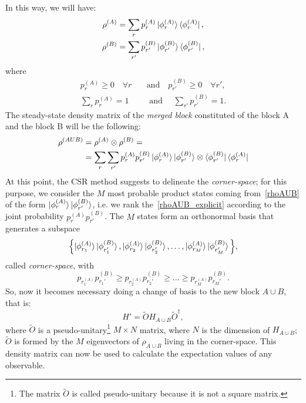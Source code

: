 In this way, we will have:
\begin{equation}
    \begin{split}
        \rho^{(A)} & = \sum_r p_r^{(A)}\ket{\phi_r^{(A)}}\bra{\phi_r^{(A)}}, \\
        \rho^{(B)} & = \sum_{r'} p_{r'}^{(B)}\ket{\phi_{r'}^{(B)}}\bra{\phi_{r'}^{(B)}},
    \end{split}
\end{equation}
where
\begin{equation*}
    \begin{split}
        p_r^{(A)} \geq 0 \quad \forall r \quad &\textrm{and} \quad p_{r'}^{(B)} \geq 0 \quad\forall r', \\
        \sum_{r} p_r^{(A)} = 1 \quad &\textrm{ and } \quad \sum_{r'} p_{r'}^{(B)} = 1.
    \end{split}
\end{equation*}
The steady-state density matrix of the \emph{merged block} constituted of the block A and the block B will be the following:
\begin{align}
\label{rhoAUB}
    \rho^{(AUB)} &= \rho^{(A)} \otimes \rho^{(B)} = \\
    \label{rhoAUB_explicit}
    &= \sum_{r} \sum_{r'} p_r^{(A)}p_{r'}^{(B)}\ket{\phi_r^{(A)}}\ket{\phi_{r'}^{(B)}} \otimes \bra{\phi_{r'}^{(B)}}\bra{\phi_{r}^{(A)}}
\end{align}
At this point, the CSR method suggests to delineate the \emph{corner-space}; for this purpose, we consider the $M$ most probable product states coming from~\ref{rhoAUB} of the form $\ket{\phi_{r}^{(A)}}\ket{\phi_{r'}^{(B)}}$, i.e. we rank the~\ref{rhoAUB_explicit} according to the joint probability $p_r^{(A)}p_{r'}^{(B)}$. The $M$ states form an orthonormal basis that generates a subspace
\begin{equation}
\label{basis_corner}
    \Bigl\{\ket{\phi_{r_1}^{(A)}}\ket{\phi_{r_1'}^{(B)}}, \ket{\phi_{r_2}^{(A)}}\ket{\phi_{r_2'}^{(B)}}, \dots, \ket{\phi_{r_M}^{(A)}}\ket{\phi_{r_M'}^{(B)}} \Bigl\},
\end{equation}
called \emph{corner-space}, with
\begin{equation*}
    p_r_1^{(A)}p_{r_1'}^{(B)} \geq p_r_2^{(A)}p_{r_2'}^{(B)} \geq \dots \geq p_r_M^{(A)}p_{r_M'}^{(B)}.
\end{equation*}
So, now it becomes necessary doing a change of basis to the new block $A \cup B$, that is:
\begin{equation}
    H' = \widetilde{O} H_{A\cup B} \widetilde{O}^\dagger,
\end{equation}
where $\widetilde{O}$ is a pseudo-unitary\footnote{The matrix $\widetilde{O}$ is called pseudo-unitary because it is not a square matrix.} $M\times N$ matrix, where $N$ is the dimension of $H_{A\cup B}$; $\widetilde{O}$ is formed by the $M$ eigenvectors of $\rho_{A\cup B}$ living in the corner-space. This density matrix can now be used to calculate the expectation values of any observable.

